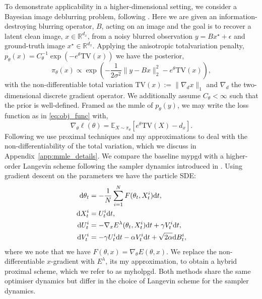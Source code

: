 To demonstrate applicability in a higher-dimensional setting, we consider a Bayesian image deblurring problem, following \cite{encinar2025proximal}. Here we are given an information-destroying blurring operator, $B$, acting on an image and the goal is to recover a latent clean image, $x\in\mathbb{R}^{d_x}$, from a noisy blurred observation $y=Bx^\star+\epsilon$ and ground-truth image $x^\star\in\mathbb{R}^{d_x}$. Applying the anisotropic \gls*{totalvariation} penalty, $p_\theta(x)=C^{-1}_\theta \exp(-e^{\theta}\mathrm{TV}(x))$ we have the posterior,
\begin{equation*}
    \pi_\theta(x)\propto \exp\left(-\frac{1}{2\sigma^2}\|y-Bx\|_2^2-e^\theta\mathrm{TV}(x)\right),
\end{equation*}
with the non-differentiable total variation $\mathrm{TV}(x):=\|\nabla_d x\|_1$ and $\nabla_d$ the two-dimensional discrete gradient operator. We additionally assume $C_\theta<\infty$ such that the prior is well-defined. Framed as the \gls*{mmle} of $p_\theta(y)$, we may write the loss function as in \eqref{eq:obj_func} with,
\begin{equation*}
    \nabla_\theta\ell(\theta)=\mathbb{E}_{X\sim\pi_\theta}\left[e^\theta\mathrm{TV}(X)-d_x\right].
\end{equation*}
Following \cite{encinar2025proximal} we use proximal techniques and \gls*{my} approximations to deal with the non-differentiability of the total variation, which we discuss in Appendix~\ref{app:mmle_details}. We compare the baseline \gls*{mypgd} with a higher-order Langevin scheme following the sampler dynamics introduced in \cite{high_order_langevin_JMLR}. Using gradient descent on the parameters we have the particle SDE:
\begin{equation}\label{eq:high_order_langevin_scheme}
    \begin{aligned}
        \mathrm{d} \theta_t&=-\frac{1}{N}\sum_{i=1}^NF(\theta_t,X^i_t)\mathrm{d} t,\\
        \mathrm{d} X^i_t&=U^i_t\mathrm{d} t,\\
        \mathrm{d} U^i_t&=-\nabla_xE^\lambda(\theta_t,X^i_t)\mathrm{d} t+\gamma V_t^i\mathrm{d} t,\\
        \mathrm{d} V^i_t&=-\gamma U^i_t\mathrm{d} t-\alpha V^i_t\mathrm{d} t+\sqrt{2\alpha}\mathrm{d} B^i_t,
    \end{aligned}
\end{equation}
where we note that we have $F(\theta,x)=\nabla_\theta E(\theta,x)$. We replace the non-differentiable $x$-gradient with $E^\lambda$, its \gls*{my} approximation, to obtain a hybrid proximal scheme, which we refer to as \gls*{myholpgd}. Both methods share the same optimiser dynamics but differ in the choice of Langevin scheme for the sampler dynamics.
